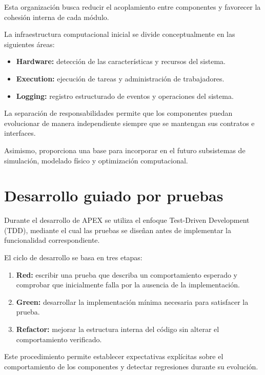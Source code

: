 Esta organización busca reducir el acoplamiento entre
componentes y favorecer la cohesión interna de cada módulo.

La infraestructura computacional inicial se divide
conceptualmente en las siguientes áreas:

\begin{itemize}
    \item \textbf{Hardware:} detección de las características
    y recursos del sistema.

    \item \textbf{Execution:} ejecución de tareas y
    administración de trabajadores.

    \item \textbf{Logging:} registro estructurado de eventos
    y operaciones del sistema.
\end{itemize}

La separación de responsabilidades permite que los
componentes puedan evolucionar de manera independiente
siempre que se mantengan sus contratos e interfaces.

Asimismo, proporciona una base para incorporar en el futuro
subsistemas de simulación, modelado físico y optimización
computacional.

\section{Desarrollo guiado por pruebas}

Durante el desarrollo de APEX se utiliza el enfoque
Test-Driven Development (TDD), mediante el cual las pruebas
se diseñan antes de implementar la funcionalidad
correspondiente.

El ciclo de desarrollo se basa en tres etapas:

\begin{enumerate}
    \item \textbf{Red:} escribir una prueba que describa
    un comportamiento esperado y comprobar que inicialmente
    falla por la ausencia de la implementación.

    \item \textbf{Green:} desarrollar la implementación
    mínima necesaria para satisfacer la prueba.

    \item \textbf{Refactor:} mejorar la estructura interna
    del código sin alterar el comportamiento verificado.
\end{enumerate}

Este procedimiento permite establecer expectativas
explícitas sobre el comportamiento de los componentes
y detectar regresiones durante su evolución.

